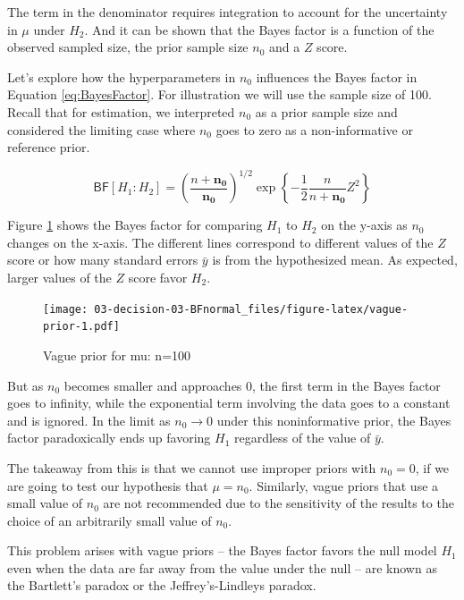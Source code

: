 \documentclass[]{book}
\theoremstyle{definition}
\theoremstyle{definition}
\theoremstyle{definition}
\theoremstyle{remark}
\begin{document}
The term in the denominator requires integration to account for the
uncertainty in \(\mu\) under \(H_2\). And it can be shown that the Bayes
factor is a function of the observed sampled size, the prior sample size
\(n_0\) and a \(Z\) score.

Let's explore how the hyperparameters in \(n_0\) influences the Bayes
factor in Equation \eqref{eq:BayesFactor}. For illustration we will use
the sample size of 100. Recall that for estimation, we interpreted
\(n_0\) as a prior sample size and considered the limiting case where
\(n_0\) goes to zero as a non-informative or reference prior.

\begin{equation}
\textsf{BF}[H_1 : H_2] = \left(\frac{n + \mathbf{n_0}}{\mathbf{n_0}}\right)^{1/2} \exp\left\{-\frac{1}{2} \frac{n }{n + \mathbf{n_0}} Z^2 \right\}
\label{eq:BayesFactor}
\end{equation}

Figure \ref{fig:vague-prior} shows the Bayes factor for comparing
\(H_1\) to \(H_2\) on the y-axis as \(n_0\) changes on the x-axis. The
different lines correspond to different values of the \(Z\) score or how
many standard errors \(\bar{y}\) is from the hypothesized mean. As
expected, larger values of the \(Z\) score favor \(H_2\).

\begin{figure}
\centering
\texttt{[image: 03-decision-03-BFnormal\_files/figure-latex/vague-prior-1.pdf]}
\caption{\label{fig:vague-prior}Vague prior for mu: n=100}
\end{figure}

But as \(n_0\) becomes smaller and approaches 0, the first term in the
Bayes factor goes to infinity, while the exponential term involving the
data goes to a constant and is ignored. In the limit as
\(n_0 \rightarrow 0\) under this noninformative prior, the Bayes factor
paradoxically ends up favoring \(H_1\) regardless of the value of
\(\bar{y}\).

The takeaway from this is that we cannot use improper priors with
\(n_0 = 0\), if we are going to test our hypothesis that \(\mu = n_0\).
Similarly, vague priors that use a small value of \(n_0\) are not
recommended due to the sensitivity of the results to the choice of an
arbitrarily small value of \(n_0\).

This problem arises with vague priors -- the Bayes factor favors the
null model \(H_1\) even when the data are far away from the value under
the null -- are known as the Bartlett's paradox or the
Jeffrey's-Lindleys paradox.
\end{document}
